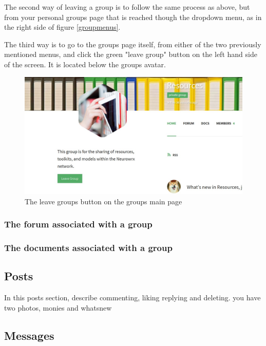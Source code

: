 \documentclass[10pt]{article}
\begin{document}
\begin{flushleft}
The second way of leaving a group is to follow the same process as above, but from your personal groups page that is reached though the dropdown menu, as in the right side of figure \ref{groupmenus}.
\end{flushleft}

\begin{flushleft}
The third way is to go to the groups page itself, from either of the two previously mentioned menus, and click the green "leave group" button on the left hand side of the screen.  It is located below the groups avatar. 
\end{flushleft}

\begin{figure}[h]
    \centering
    \includegraphics[scale=0.3]{images/leavegroup.jpg}
    \caption{The leave groups button on the groups main page}
    \label{leavegroup}
\end{figure}

\subsubsection{The forum associated with a group}
\subsubsection{The documents associated with a group}


\subsection{Posts}
In this posts section, describe commenting, liking replying and deleting.  you have two photos, monies and whatsnew

\subsection{Messages}
\end{document}
